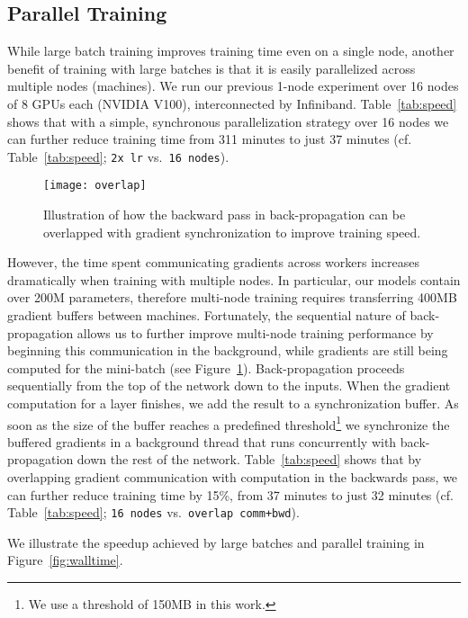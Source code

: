 \documentclass[11pt,a4paper]{article}
\begin{document}
\subsection{Parallel Training}\label{sec:parallel}

While large batch training improves training time even on a single node,
another benefit of training with large batches is that it is easily parallelized across multiple nodes (machines).
We run our previous 1-node experiment over 16 nodes of 8 GPUs each (NVIDIA V100), interconnected by Infiniband.
Table~\ref{tab:speed} shows that with a simple, synchronous parallelization strategy over 16 nodes we can further reduce training time from 311 minutes to just 37 minutes (cf. Table~\ref{tab:speed}; \texttt{2x lr} vs.~\texttt{16 nodes}).

\begin{figure}
\begin{center}
\texttt{[image: overlap]}
\end{center}
\caption{Illustration of how the backward pass in back-propagation  can be overlapped with gradient synchronization to improve training speed.}
\label{fig:overlap}
\end{figure}


However, the time spent communicating gradients across workers increases dramatically when training with multiple nodes.
In particular, our models contain over 200M parameters, therefore multi-node training requires transferring 400MB gradient buffers between machines.
Fortunately, the sequential nature of back-propagation allows us to further improve multi-node training performance by beginning this communication in the background, while gradients are still being computed for the mini-batch (see Figure~\ref{fig:overlap}).
Back-propagation proceeds sequentially from the top of the network down to the inputs.
When the gradient computation for a layer finishes, we add the result to a synchronization buffer. 
As soon as the size of the buffer reaches a predefined threshold\footnote{We use a threshold of 150MB in this work.} we synchronize the buffered gradients in a background thread that runs concurrently with back-propagation down the rest of the network.
Table~\ref{tab:speed} shows that by overlapping gradient communication with computation in the backwards pass,
we can further reduce training time by 15\%, from 37 minutes to just 32 minutes (cf. Table~\ref{tab:speed}; \texttt{16 nodes} vs.~\texttt{overlap comm+bwd}).

We illustrate the speedup achieved by large batches and parallel training in Figure~\ref{fig:walltime}.
\end{document}
